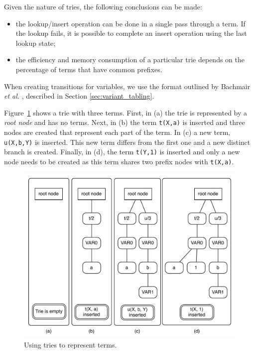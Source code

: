 Given the nature of tries, the following conclusions can be made:

\begin{itemize}
  \item the lookup/insert operation can be done in a single pass through a term. If the lookup fails, it is possible
  to complete an insert operation using the last lookup state;
  \item the efficiency and memory consumption of a
  particular trie depends on the percentage of terms that have common prefixes.
\end{itemize}

When creating transitions for variables, we use the format outlined by Bachmair \textit{et al.} \cite{Bachmair-93},
described in Section \ref{sec:variant_tabling}.

Figure~\ref{fig:tries_use} shows a trie with three terms. First, in (a) the trie is represented by a \textit{root node} and has
no terms. Next, in (b) the term \texttt{t(X,a)} is inserted and three nodes are created that represent each part of the term.
In (c) a new term, \texttt{u(X,b,Y)} is inserted. This new term differs from the first one and a new distinct branch is created.
Finally, in (d), the term \texttt{t(Y,1)} is inserted and only a new node needs to be created as this term shares
two prefix nodes with \texttt{t(X,a)}.

\begin{figure}[ht]
  \centering
    \includegraphics[scale=0.6]{tries.pdf}
  \caption{Using tries to represent terms.}
  \label{fig:tries_use}
\end{figure}

